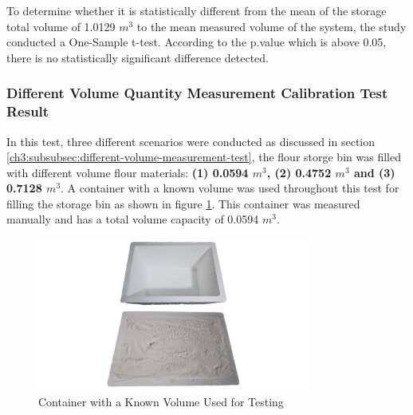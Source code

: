 To determine whether it is statistically different from the mean of the storage total volume of 1.0129 $m^3$ to the mean measured volume of the system, the study conducted a One-Sample t-test. According to the p.value which is above 0.05, there is no statistically significant difference detected.

\subsubsection{Different Volume Quantity Measurement Calibration Test Result}

In this test, three different scenarios were conducted as discussed in section \ref{ch3:subsubsec:different-volume-measurement-test}, the flour storge bin was filled with different volume flour materials: \textbf{(1) 0.0594 $m^3$, (2) 0.4752 $m^3$ and (3) 0.7128 $m^3$}. A container with a known volume was used throughout this test for filling the storage bin as shown in figure \ref{ch4:fig:known-volume}. This container was measured manually and has a total volume capacity of 0.0594 $m^3$.\\

\begin{figure}[H]
	\centering
	\includegraphics[width=0.8\textwidth]{Figures/known-volume}
	\caption{Container with a Known Volume Used for Testing}
	\label{ch4:fig:known-volume}
\end{figure}



